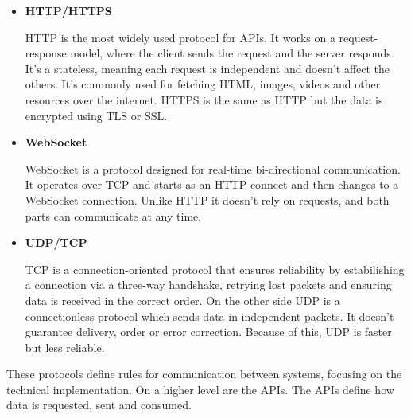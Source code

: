 \begin{itemize}

	\item \textbf{HTTP/HTTPS}

	      HTTP is the most widely used protocol for APIs. It works on a
	      request-response model, where the client sends the request and the server
	      responds. It's a stateless, meaning each request is independent and doesn't
	      affect the others. It's commonly used for fetching HTML, images, videos
	      and other resources over the internet. HTTPS is the same as HTTP but the
	      data is encrypted using TLS or SSL.


	\item \textbf{WebSocket}

	      WebSocket is a protocol designed for real-time bi-directional communication.
	      It operates over TCP and starts as an HTTP connect and then changes to a
	      WebSocket connection. Unlike HTTP it doesn't rely on requests, and both
	      parts can communicate at any time.


	\item \textbf{UDP/TCP}

	      TCP is a connection-oriented protocol that ensures reliability by
	      estabilishing a connection via a three-way handshake, retrying lost
	      packets and ensuring data is received in the correct order.
	      On the other side UDP is a connectionless protocol which sends data in
	      independent packets. It doesn't guarantee delivery, order or error
	      correction. Because of this, UDP is faster but less reliable.


\end{itemize}


These protocols define rules for communication between systems, focusing on the
technical implementation. On a higher level are the APIs.
The APIs define how data is requested, sent and consumed.

